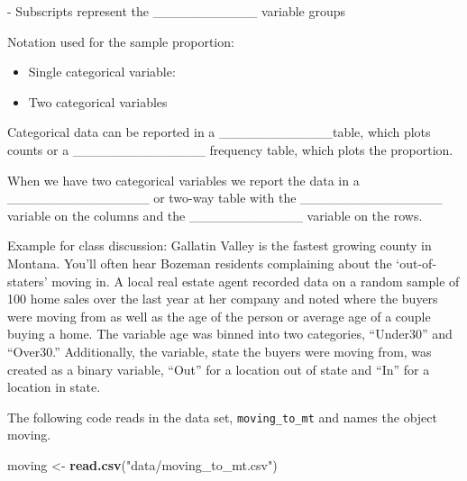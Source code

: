 \documentclass[
]{report}
\newenvironment{Shaded}{\begin{snugshade}}{\end{snugshade}}
\newcommand{\FunctionTok}[1]{\textcolor[rgb]{0.13,0.29,0.53}{\textbf{#1}}}
\newcommand{\NormalTok}[1]{#1}
\newcommand{\OtherTok}[1]{\textcolor[rgb]{0.56,0.35,0.01}{#1}}
\newcommand{\StringTok}[1]{\textcolor[rgb]{0.31,0.60,0.02}{#1}}
\providecommand{\tightlist}{%
  \setlength{\itemsep}{0pt}\setlength{\parskip}{0pt}}
\newcommand{\rgi}{\hspace{24pt}}  %
\begin{document}
\vspace{0.2in}

\rgi \rgi - Subscripts represent the \_\_\_\_\_\_\_\_\_\_\_ variable groups

Notation used for the sample proportion:

\begin{itemize}
\tightlist
\item
  Single categorical variable:
\end{itemize}

\vspace{0.2in}

\begin{itemize}
\tightlist
\item
  Two categorical variables
\end{itemize}

\vspace{0.2in}


Categorical data can be reported in a \_\_\_\_\_\_\_\_\_\_\_\_table,
which plots counts or a \_\_\_\_\_\_\_\_\_\_\_\_\_\_
frequency table, which plots the proportion.

When we have two categorical variables we report the data in a \_\_\_\_\_\_\_\_\_\_\_\_\_\_\_ or two-way table with the \_\_\_\_\_\_\_\_\_\_\_\_\_\_\_ variable on the columns and the \_\_\_\_\_\_\_\_\_\_\_\_ variable on the rows.


\vspace{2mm}

Example for class discussion: Gallatin Valley is the fastest growing county in Montana. You'll often hear Bozeman residents complaining about the `out-of-staters' moving in. A local real estate agent recorded data on a random sample of 100 home sales over the last year at her company and noted where the buyers were moving from as well as the age of the person or average age of a couple buying a home. The variable age was binned into two categories, ``Under30'' and ``Over30.'' Additionally, the variable, state the buyers were moving from, was created as a binary variable, ``Out'' for a location out of state and ``In'' for a location in state.

The following code reads in the data set, \texttt{moving\_to\_mt} and names the object moving.

\begin{Shaded}
\begin{Highlighting}[]
\NormalTok{moving }\OtherTok{\textless{}{-}} \FunctionTok{read.csv}\NormalTok{(}\StringTok{"data/moving\_to\_mt.csv"}\NormalTok{)}
\end{Highlighting}
\end{Shaded}
\end{document}
